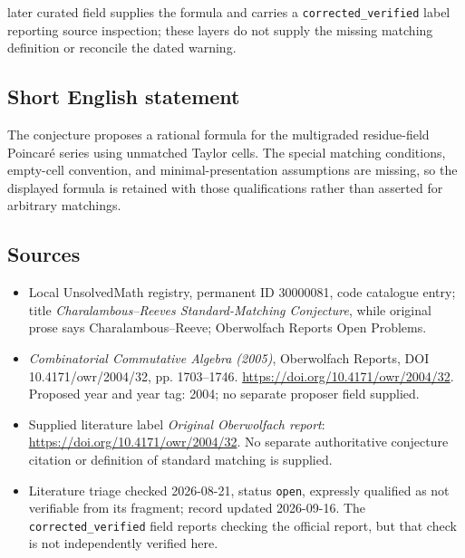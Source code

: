 \documentclass[11pt]{article}
\begin{document}
later curated field supplies the formula and carries a \texttt{corrected\_verified} label reporting source inspection; these layers do not supply the missing matching definition or reconcile the dated warning.
\subsection{Short English statement}
The conjecture proposes a rational formula for the multigraded residue-field Poincar\'e series using unmatched Taylor cells. The special matching conditions, empty-cell convention, and minimal-presentation assumptions are missing, so the displayed formula is retained with those qualifications rather than asserted for arbitrary matchings.
\subsection{Sources}
\begin{itemize}\item Local UnsolvedMath registry, permanent ID 30000081, code catalogue entry; title \emph{Charalambous--Reeves Standard-Matching Conjecture}, while original prose says Charalambous--Reeve; Oberwolfach Reports Open Problems.\item \emph{Combinatorial Commutative Algebra (2005)}, Oberwolfach Reports, DOI 10.4171/owr/2004/32, pp. 1703--1746. \url{https://doi.org/10.4171/owr/2004/32}. Proposed year and year tag: 2004; no separate proposer field supplied.\item Supplied literature label \emph{Original Oberwolfach report}: \url{https://doi.org/10.4171/owr/2004/32}. No separate authoritative conjecture citation or definition of standard matching is supplied.\item Literature triage checked 2026-08-21, status \texttt{open}, expressly qualified as not verifiable from its fragment; record updated 2026-09-16. The \texttt{corrected\_verified} field reports checking the official report, but that check is not independently verified here.\end{itemize}
\end{document}
